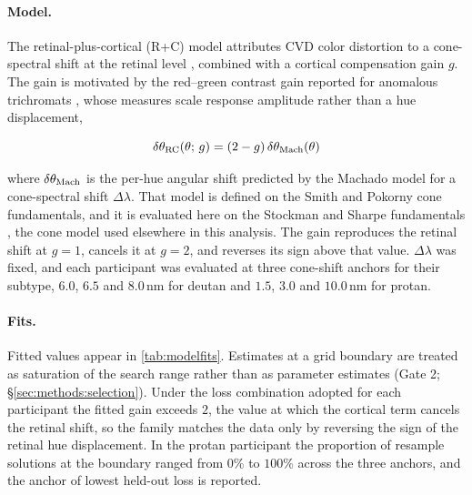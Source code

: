 

\paragraph{Model.}
The retinal-plus-cortical (R+C) model attributes CVD color distortion to a
cone-spectral shift at the retinal level \parencite{machado2009}, combined with a
cortical compensation gain $g$. The gain is motivated by the red--green contrast
gain reported for anomalous trichromats \parencite{boehm2014,tregillus2021},
whose measures scale response amplitude rather than a hue displacement,

\begin{equation}
  \delta\theta_{\rm RC}(\theta;\,g)
    = (2 - g)\,\delta\theta_{\rm Mach}(\theta)
  \label{eq:rc}
\end{equation}

where $\delta\theta_{\rm Mach}$ is the per-hue angular shift predicted by the
Machado model for a cone-spectral shift $\Delta\lambda$. That model is defined on
the Smith and Pokorny cone fundamentals, and it is evaluated here on the Stockman
and Sharpe fundamentals \parencite{stockman2000}, the cone model used elsewhere in
this analysis. The gain reproduces the retinal shift at $g = 1$, cancels it at
$g = 2$, and reverses its sign above that value. $\Delta\lambda$ was fixed, and
each participant was evaluated at three cone-shift anchors for their subtype,
$6.0$, $6.5$ and $8.0$\,nm for deutan and $1.5$, $3.0$ and $10.0$\,nm for protan.

\paragraph{Fits.}
Fitted values appear in \cref{tab:modelfits}. Estimates at a grid boundary are
treated as saturation of the search range rather than as parameter estimates
(Gate 2; \S\ref{sec:methods:selection}). Under the loss combination adopted for
each participant the fitted gain exceeds $2$, the value at which the cortical
term cancels the retinal shift, so the family matches the data only by reversing
the sign of the retinal hue displacement. In the protan participant the proportion of
resample solutions at the boundary ranged from $0\%$ to $100\%$ across the three
anchors, and the anchor of lowest held-out loss is reported.

